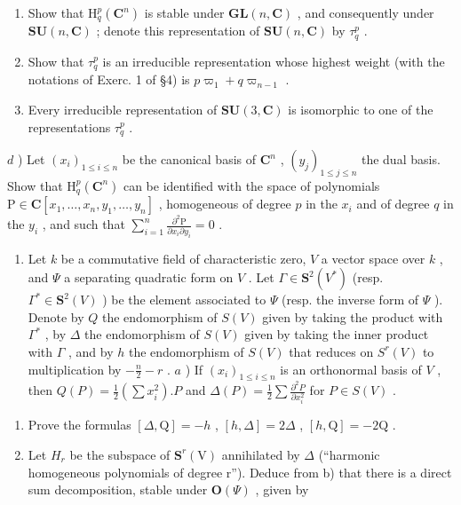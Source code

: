 \begin{enumerate}
\begin{enumerate}
\def\labelenumi{\alph{enumi})}
\item
  Show that \(\mathrm{H}_{q}^{p}(\mathbf{C}^{n})\) is stable under \(\mathbf{GL}(n,\mathbf{C})\) , and consequently under \(\mathbf{SU}(n,\mathbf{C})\) ; denote this representation of \(\mathbf{SU}(n,\mathbf{C})\) by \(\tau_{q}^{p}\) .
\item
  Show that \(\tau_q^p\) is an irreducible representation whose highest weight (with the notations of Exerc. 1 of §4) is \(p\varpi_1 + q\varpi_{n - 1}\) .
\item
  Every irreducible representation of \(\mathbf{SU}(3,\mathbf{C})\) is isomorphic to one of the representations \(\tau_q^p\) .
\end{enumerate}

\(d\) ) Let \((x_{i})_{1\leq i\leq n}\) be the canonical basis of \(\mathbf{C}^n\) , \((y_{j})_{1\leq j\leq n}\) the dual basis. Show that \(\mathrm{H}_q^p (\mathbf{C}^n)\) can be identified with the space of polynomials \(\mathrm{P}\in \mathbf{C}[x_1,\ldots ,x_n,y_1,\ldots ,y_n]\) , homogeneous of degree \(p\) in the \(x_{i}\) and of degree \(q\) in the \(y_{i}\) , and such that \(\sum_{i = 1}^{n}\frac{\partial^2\mathrm{P}}{\partial x_i\partial y_i} = 0\) .

\begin{enumerate}
\def\labelenumi{\arabic{enumi})}
\setcounter{enumi}{4}
\tightlist
\item
  Let \(k\) be a commutative field of characteristic zero, \(V\) a vector space over \(k\) , and \(\varPsi\) a separating quadratic form on \(V\) . Let \(\varGamma \in \mathbf{S}^2(V^*)\) (resp. \(\varGamma^* \in \mathbf{S}^2(V)\) ) be the element associated to \(\varPsi\) (resp. the inverse form of \(\varPsi\) ). Denote by \(Q\) the endomorphism of \(S(V)\) given by taking the product with \(\varGamma^*\) , by \(\varDelta\) the endomorphism of \(S(V)\) given by taking the inner product with \(\varGamma\) , and by \(h\) the endomorphism of \(S(V)\) that reduces on \(S^r(V)\) to multiplication by \(-\frac{n}{2} - r\) . \(a\) ) If \((x_i)_{1\leq i\leq n}\) is an orthonormal basis of \(V\) , then \(Q(P) = \frac{1}{2}\left(\sum x_i^2\right).P\) and \(\varDelta(P) = \frac{1}{2}\sum \frac{\partial^2P}{\partial x_i^2}\) for \(P \in S(V)\) .
\end{enumerate}

\begin{enumerate}
\def\labelenumi{\alph{enumi})}
\setcounter{enumi}{1}
\item
  Prove the formulas \([\Delta, \mathrm{Q}] = -h\) , \([h, \Delta] = 2\Delta\) , \([h, \mathrm{Q}] = -2\mathrm{Q}\) .
\item
  Let \(H_{r}\) be the subspace of \(\mathbf{S}^{r}(\mathrm{V})\) annihilated by \(\Delta\) (``harmonic homogeneous polynomials of degree r''). Deduce from b) that there is a direct sum decomposition, stable under \(\mathbf{O}(\varPsi)\) , given by
\end{enumerate}


\end{enumerate}
